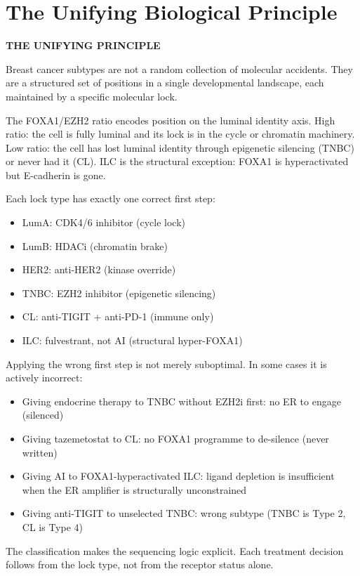 \documentclass[12pt, a4paper]{article}
\begin{document}
\section{The Unifying Biological Principle}

\begin{center}
\colorbox{summarybox}{
\begin{minipage}{0.88\textwidth}
\vspace{0.6em}
\textbf{THE UNIFYING PRINCIPLE}

\medskip
Breast cancer subtypes are not a random collection
of molecular accidents. They are a structured set
of positions in a single developmental landscape,
each maintained by a specific molecular lock.

\medskip
The FOXA1/EZH2 ratio encodes position on the luminal
identity axis. High ratio: the cell is fully luminal
and its lock is in the cycle or chromatin machinery.
Low ratio: the cell has lost luminal identity through
epigenetic silencing (TNBC) or never had it (CL).
ILC is the structural exception: FOXA1 is
hyperactivated but E-cadherin is gone.

\medskip
Each lock type has exactly one correct first step:
\begin{itemize}[noitemsep,leftmargin=*]
  \item LumA: CDK4/6 inhibitor (cycle lock)
  \item LumB: HDACi (chromatin brake)
  \item HER2: anti-HER2 (kinase override)
  \item TNBC: EZH2 inhibitor (epigenetic silencing)
  \item CL: anti-TIGIT $+$ anti-PD-1 (immune only)
  \item ILC: fulvestrant, not AI (structural hyper-FOXA1)
\end{itemize}

\medskip
Applying the wrong first step is not merely
suboptimal. In some cases it is actively incorrect:
\begin{itemize}[noitemsep,leftmargin=*]
  \item Giving endocrine therapy to TNBC without
        EZH2i first: no ER to engage (silenced)
  \item Giving tazemetostat to CL: no FOXA1 programme
        to de-silence (never written)
  \item Giving AI to FOXA1-hyperactivated ILC:
        ligand depletion is insufficient when the
        ER amplifier is structurally unconstrained
  \item Giving anti-TIGIT to unselected TNBC:
        wrong subtype (TNBC is Type 2, CL is Type 4)
\end{itemize}

\medskip
The classification makes the sequencing logic explicit.
Each treatment decision follows from the lock type,
not from the receptor status alone.
\vspace{0.5em}
\end{minipage}
}
\end{center}
\end{document}
